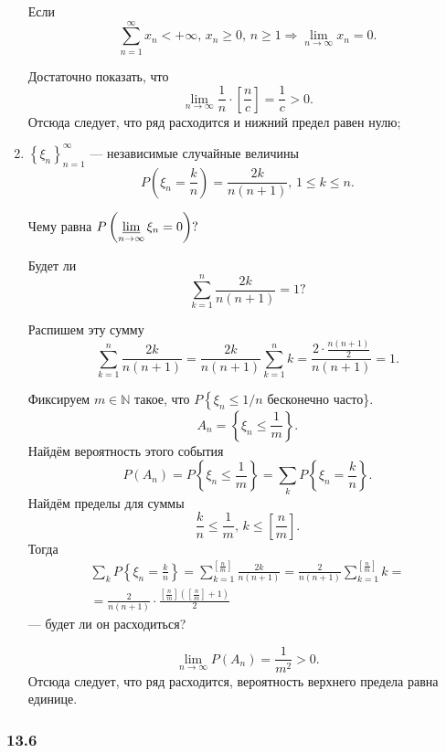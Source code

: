 \begin{enumerate}[label=\alph*)]
Если
$$ \sum \limits_{n=1}^{ \infty} x_n < + \infty, \,
x_n \geq 0, \,
n \geq 1 \Rightarrow
\lim \limits_{n \to \infty } x_n =
0.$$

Достаточно показать, что
$$ \lim \limits_{n \to \infty } \frac{1}{n} \cdot \left[ \frac{n}{c} \right] =
\frac{1}{c} >
0.$$
Отсюда следует, что ряд расходится и нижний предел равен нулю;
\item $ \left\{ \xi_n \right\}_{n=1}^{ \infty }$ --- независимые случайные величины
$$P \left( \xi_n = \frac{k}{n} \right) =
\frac{2k}{n \left( n+1 \right) }, \, 1 \leq k \leq n.$$

Чему равна $P \left( \varliminf \limits_{n \to \infty } \xi_n = 0 \right)?$

Будет ли
$$ \sum \limits_{k=1}^n \frac{2k}{n \left( n+1 \right) } =
1?$$

Распишем эту сумму
$$ \sum \limits_{k=1}^n \frac{2k}{n \left( n+1 \right) } =
\frac{2k}{n \left( n+1 \right) } \sum \limits_{k=1}^n k=
\frac{2 \cdot \frac{n \left( n+1 \right) }{2}}{n \left( n+1 \right) } =
1.$$

Фиксируем $m \in \mathbb{N}$ такое, что $P \left\{ \xi_n \leq 1/n \right.$ бесконечно часто\}.
$$A_n =
\left\{ \xi_n \leq \frac{1}{m} \right\}.$$
Найдём вероятность этого события
$$P \left( A_n \right) =
P \left\{ \xi_n \leq \frac{1}{m} \right\} =
\sum \limits_{k} P \left\{ \xi_n = \frac{k}{n} \right\}.$$
Найдём пределы для суммы
$$ \frac{k}{n} \leq \frac{1}{m}, \, k \leq \left[ \frac{n}{m} \right].$$
Тогда
\begin{equation*}
\begin{split}
\sum \limits_{k} P \left\{ \xi_n = \frac{k}{n} \right\} =
\sum \limits_{k=1}^{ \left[ \frac{n}{m} \right] } \frac{2k}{n \left( n+1 \right) } =
\frac{2}{n \left( n+1 \right) } \sum \limits_{k=1}^{ \left[ \frac{n}{m} \right] } k = \\
= \frac{2}{n \left( n+1 \right) } \cdot \frac{ \left[ \frac{n}{m} \right] \left( \left[ \frac{n}{m} \right] + 1 \right) }{2}
\end{split}
\end{equation*}
--- будет ли он расходиться?

$$ \lim \limits_{n \to \infty } P \left( A_n \right) =
\frac{1}{m^2} >
0.$$
Отсюда следует, что ряд расходится, вероятность верхнего предела равна единице.
\end{enumerate}

\subsubsection*{13.6}


